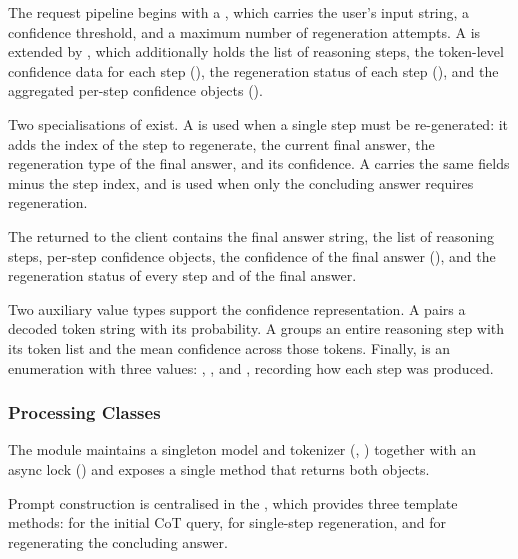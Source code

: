 The request pipeline begins with a , which carries the user's
input string, a confidence threshold, and a maximum number of regeneration
attempts. A  is extended by , which
additionally holds the list of reasoning steps, the token-level confidence data for each
step (), the regeneration status of each step
(), and the aggregated per-step confidence objects
().
 
Two specialisations of  exist. A
 is used when a single step must be re-generated: it adds
the index of the step to regenerate, the current final answer, the regeneration type of
the final answer, and its confidence. A  carries the
same fields minus the step index, and is used when only the concluding answer requires
regeneration.
 
The  returned to the client contains the final answer string,
the list of reasoning steps, per-step confidence objects, the confidence of the final
answer (), and the regeneration status of every step and of the
final answer.
 
Two auxiliary value types support the confidence representation. A
 pairs a decoded token string with its probability. A
 groups an entire reasoning step with its token list and the
mean confidence across those tokens. Finally,  is an enumeration
with three values: , , and ,
recording how each step was produced.
 
\subsubsection{Processing Classes}
 
The  module maintains a singleton model and tokenizer
(, ) together with an async lock ()
and exposes a single  method that returns both objects.
 
Prompt construction is centralised in the , which provides three
template methods:  for the initial CoT query,
 for single-step regeneration, and
 for regenerating the concluding answer.
 
